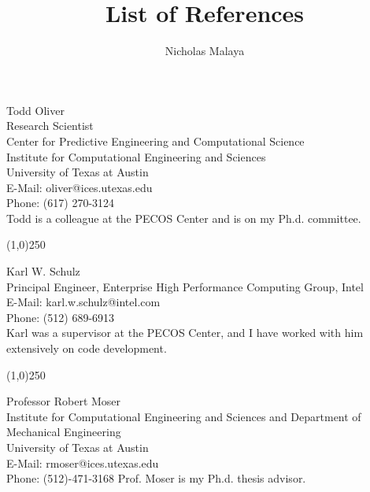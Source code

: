 \documentclass[10pt]{article}
\title{List of References}
\author{Nicholas Malaya}
\begin{document}
\maketitle


\noindent Todd Oliver \\
Research Scientist \\
Center for Predictive Engineering and Computational Science \\
Institute for Computational Engineering and Sciences \\
University of Texas at Austin \\
E-Mail: oliver@ices.utexas.edu \\
Phone: (617) 270-3124 \\
\newline
\newline
Todd is a colleague at the PECOS Center and is on my Ph.d. committee. 
\newline
\newline
\begin{center}
\line(1,0){250}
\end{center}
Karl W. Schulz \\
Principal Engineer, Enterprise High Performance Computing Group, Intel \\
E-Mail: karl.w.schulz@intel.com \\
Phone: (512) 689-6913 \\
\newline
\newline
Karl was a supervisor at the PECOS Center, and I have worked with him extensively on code development.
\newline
\newline
\begin{center}
\line(1,0){250}
\end{center}
\noindent Professor Robert Moser \\
Institute for Computational Engineering and Sciences
and Department of Mechanical Engineering \\
University of Texas at Austin \\
E-Mail: rmoser@ices.utexas.edu \\
\noindent Phone: (512)-471-3168 
\newline
\newline
Prof. Moser is my Ph.d. thesis advisor. 
\end{document}
